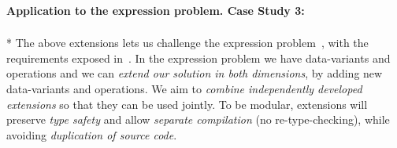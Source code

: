 %
%
% 
%



\paragraph{Application to the expression problem. Case Study 3:}${}_{}$\\*
The above extensions lets us challenge the expression problem~\cite{wadler1998expression},
with the requirements exposed in~\cite{Zenger-Odersky2005}.
In the expression problem we have data-variants and operations and we can
\emph{extend our solution in both dimensions},
by adding new data-variants and operations.
We aim to \emph{combine independently developed extensions} so
that they can be used jointly.
To be modular, extensions will preserve \emph{type safety}
and allow \emph{separate compilation} (no re-type-checking),
while avoiding \emph{duplication of source code}.

